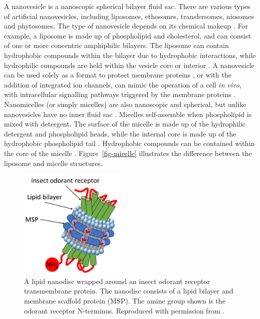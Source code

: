 \documentclass[
  a4paper,
]{scrbook}
\begin{document}
A nanovesicle is a nanoscopic spherical bilayer fluid sac. There are
various types of artificial nanovesicles, including liposomes,
ethosomes, transfersomes, niosomes and phytosomes. The type of
nanovesicle depends on its chemical makeup \autocite{Ramadon2022}. For
example, a liposome is made up of phospholipid and cholesterol, and can
consist of one or more concentric amphiphilic bilayers. The liposome can
contain hydrophobic compounds within the bilayer due to hydrophobic
interactions, while hydrophilic compounds are held within the vesicle
core or interior \autocite{Nath2007,Ramadon2022}. A nanovesicle can be
used solely as a format to protect membrane proteins
\autocite{Murugathas2020}, or with the addition of integrated ion
channels, can mimic the operation of a cell \emph{in vivo}, with
intracellular signalling pathways triggered by the membrane proteins
\autocite{Lim2015}. Nanomicelles (or simply micelles) are also
nanoscopic and spherical, but unlike nanovesicles have no inner fluid
sac \autocite{Nath2007,Bose2021}. Micelles self-assemble when
phospholipid is mixed with detergent. The surface of the micelle is made
up of the hydrophilic detergent and phospholipid heads, while the
internal core is made up of the hydrophobic phospholipid tail
\autocite{Nath2007}. Hydrophobic compounds can be contained within the
core of the micelle \autocite{Bose2021}. Figure~\ref{fig-micelle}
illustrates the difference between the liposome and micelle structures.

\begin{figure}

{\centering \includegraphics[width=0.45\textwidth,height=\textheight]{figures/ch3/iOR_nanodisc.png}

}

\caption{\label{fig-msp-iOR-nanodisc}A lipid nanodisc wrapped around an
insect odorant receptor transmembrane protein. The nanodisc consists of
a lipid bilayer and membrane scaffold protein (MSP). The amine group
shown is the odorant receptor N-terminus. Reproduced with permission
from \autocite{Murugathas2019a}.}

\end{figure}
\end{document}
